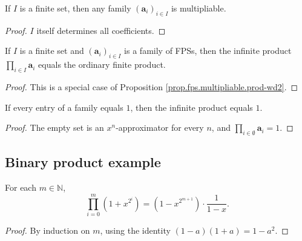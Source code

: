 \begin{lemma}
\label{lem.fps.multipliable-of-finite}
\leanhelper
\leanok
If $I$ is a finite set, then any family $\left(\mathbf{a}_{i}\right)_{i\in I}$
is multipliable.
\end{lemma}

\begin{proof}
\leanok
$I$ itself determines all coefficients.
\end{proof}

\begin{lemma}
\label{lem.fps.infprod-of-finite}
\leanhelper
\leanok
If $I$ is a finite set and $\left(\mathbf{a}_{i}\right)_{i\in I}$
is a family of FPSs, then the infinite product $\prod_{i\in I}\mathbf{a}_{i}$
equals the ordinary finite product.
\end{lemma}

\begin{proof}
\leanok
This is a special case of Proposition \ref{prop.fps.multipliable.prod-wd2}.
\end{proof}

\begin{lemma}
\label{lem.fps.tprod-const-one}
\leanhelper
\leanok
If every entry of a family equals $1$, then the infinite product equals $1$.
\end{lemma}

\begin{proof}
\leanok
The empty set is an $x^n$-approximator for every $n$,
and $\prod_{i\in\emptyset}\mathbf{a}_i = 1$.
\end{proof}

\subsection{Binary product example}

\begin{lemma}
\label{lem.fps.binary-prod-finite}
\leanhelper
\leanok
For each $m\in\mathbb{N}$,
\[
\prod_{i=0}^{m}\left(1+x^{2^{i}}\right)
=\left(1-x^{2^{m+1}}\right)\cdot\frac{1}{1-x}.
\]
\end{lemma}

\begin{proof}
By induction on $m$, using the identity $\left(1-a\right)\left(1+a\right)=1-a^{2}$.
\end{proof}


